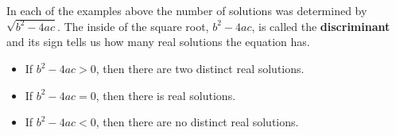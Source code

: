 \documentclass{ximera}
\begin{document}
In each of the examples above the number of solutions was determined by $\sqrt{b^2 - 4 a c}$.  The inside of the square root, $b^2 - 4 a c$, is called the \textbf{discriminant} and its sign tells us how many real solutions the equation has.


\begin{itemize}
\item If $b^2 - 4 a c > 0$, then there are two distinct real solutions.
\item If $b^2 - 4 a c = 0$, then there is real solutions.
\item If $b^2 - 4 a c < 0$, then there are no distinct real solutions.

\end{itemize}
\end{document}
